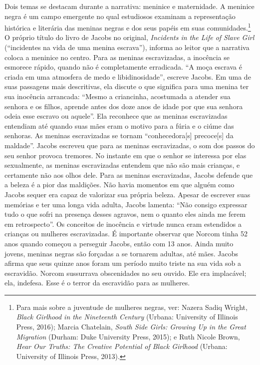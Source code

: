 Dois temas se destacam durante a narrativa: meninice e maternidade. A
meninice negra é um campo emergente no qual estudiosos examinam a
representação histórica e literária das meninas negras e dos seus papéis
em suas comunidades.\footnote{Para mais sobre a juventude de mulheres
  negras, ver: Nazera Sadiq Wright, \emph{Black Girlhood in the
  Nineteenth Century} (Urbana: University of Illinois Press, 2016);
  Marcia Chatelain, \emph{South Side Girls: Growing Up in the Great
  Migration} (Durham: Duke University Press, 2015); e Ruth Nicole Brown,
  \emph{Hear Our Truths: The Creative Potential of Black Girlhood}
  (Urbana: University of Illinois Press, 2013).} O próprio título do
livro de Jacobs no original, \emph{Incidents in the Life of Slave Girl}
(``incidentes na vida de uma menina escrava''), informa ao leitor que a
narrativa coloca a meninice no centro. Para as meninas escravizadas, a
inocência se esmorece rápido, quando não é completamente erradicada. ``A
moça escrava é criada em uma atmosfera de medo e libidinosidade'',
escreve Jacobs. Em uma de suas passagens mais descritivas, ela discute o
que significa para uma menina ter sua inocência arrancada: ``Mesmo a
criancinha, acostumada a atender
sua senhora e os filhos, aprende antes dos doze anos de idade por que
sua senhora odeia esse escravo ou aquele''. Ela reconhece que as meninas
escravizadas entendiam até quando suas mães eram o motivo para a fúria e
o ciúme das senhoras. As meninas escravizadas se tornam
``conhecedora{[}s{]} precoce{[}s{]} da maldade''. Jacobs escreveu que
para as meninas escravizadas, o som dos passos do seu senhor provoca
tremores. No instante em que o senhor se interessa por elas sexualmente,
as meninas escravizadas entendem que não são mais crianças, e certamente
não aos olhos dele. Para as meninas escravizadas, Jacobs defende que a
beleza é a pior das maldições. Não havia momentos em que alguém como
Jacobs sequer era capaz de valorizar sua própria beleza. Apesar de
escrever suas memórias e ter uma longa vida adulta, Jacobs lamenta:
``Não consigo expressar tudo o que sofri na presença desses agravos, nem
o quanto eles ainda me ferem em retrospecto''. Os conceitos de inocência
e virtude nunca eram estendidos a crianças ou mulheres escravizadas. É
importante observar que Norcom tinha 52 anos quando começou a perseguir
Jacobs, então com 13 anos. Ainda muito jovens, meninas negras são
forçadas a se tornarem adultas, até mães. Jacobs afirma que seus quinze
anos foram um período muito triste na sua vida sob a escravidão. Norcom
sussurrava obscenidades no seu ouvido. Ele era implacável; ela,
indefesa. Esse é o terror da escravidão para as mulheres.

